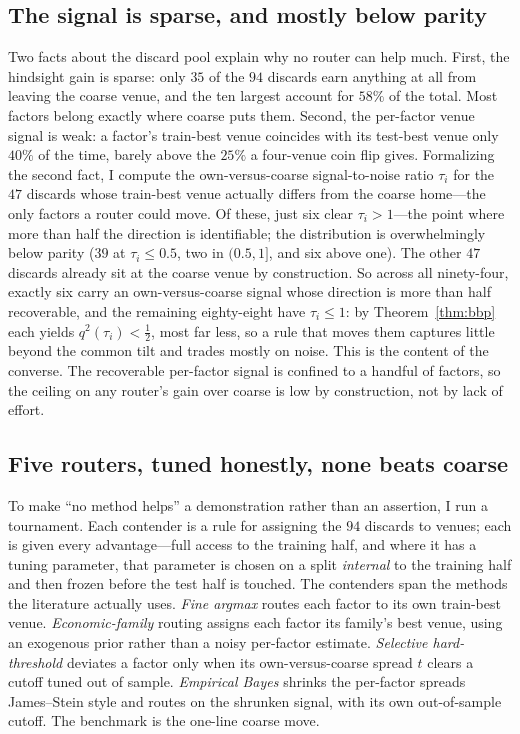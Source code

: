 \documentclass[12pt]{article}
\theoremstyle{plain}
\theoremstyle{definition}
\begin{document}
\subsection{The signal is sparse, and mostly below parity}

Two facts about the discard pool explain why no router can help much. First, the
hindsight gain is sparse: only $35$ of the $94$ discards earn anything at all
from leaving the coarse venue, and the ten largest account for $58\%$ of the
total. Most factors belong exactly where coarse puts them. Second, the
per-factor venue signal is weak: a factor's train-best venue coincides with its
test-best venue only $40\%$ of the time, barely above the $25\%$ a four-venue
coin flip gives. Formalizing the second fact, I compute the own-versus-coarse
signal-to-noise ratio $\tau_i$ for the $47$ discards whose train-best venue
actually differs from the coarse home---the only factors a router could move. Of
these, just six clear $\tau_i>1$---the point where more than half the direction
is identifiable; the distribution is overwhelmingly below parity ($39$ at
$\tau_i\le 0.5$, two in $(0.5,1]$, and six above one). The other $47$ discards
already sit at the coarse venue by construction. So across all ninety-four,
exactly six carry an own-versus-coarse signal whose direction is more than half
recoverable, and the remaining eighty-eight have $\tau_i\le 1$: by
Theorem~\ref{thm:bbp} each yields $q^2(\tau_i)<\tfrac12$, most far less, so a
rule that moves them captures little beyond the common tilt and trades mostly on
noise. This is the content of the converse. The recoverable per-factor signal is
confined to a handful of factors, so the ceiling on any router's gain over coarse
is low by construction, not by lack of effort.

\subsection{Five routers, tuned honestly, none beats coarse}

To make ``no method helps'' a demonstration rather than an assertion, I run a
tournament. Each contender is a rule for assigning the $94$ discards to venues;
each is given every advantage---full access to the training half, and where it
has a tuning parameter, that parameter is chosen on a split \emph{internal} to
the training half and then frozen before the test half is touched. The
contenders span the methods the literature actually uses. \emph{Fine argmax}
routes each factor to its own train-best venue. \emph{Economic-family} routing
assigns each factor its family's best venue, using an exogenous prior rather than
a noisy per-factor estimate. \emph{Selective hard-threshold} deviates a factor
only when its own-versus-coarse spread $t$ clears a cutoff tuned out of sample.
\emph{Empirical Bayes} shrinks the per-factor spreads James--Stein style and
routes on the shrunken signal, with its own out-of-sample cutoff. The benchmark
is the one-line coarse move.
\end{document}
